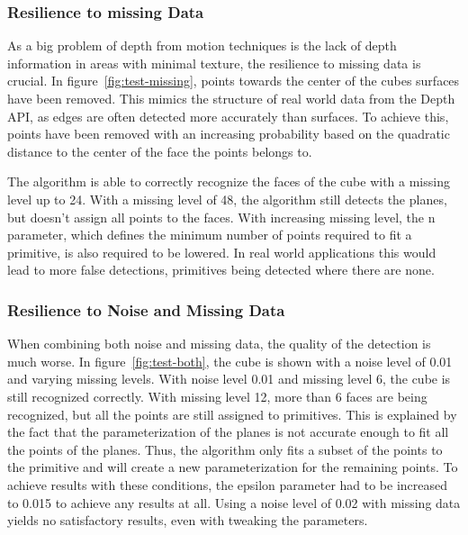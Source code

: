 \subsubsection{Resilience to missing Data}

As a big problem of depth from motion techniques is the lack of depth information in areas with minimal texture,
the resilience to missing data is crucial.
In figure~\ref{fig:test-missing}, points towards the center of the cubes surfaces have been removed.
This mimics the structure of real world data from the Depth API,
as edges are often detected more accurately than surfaces.
To achieve this, points have been removed with an increasing probability based on the
quadratic distance to the center of the face the points belongs to.

The algorithm is able to correctly recognize the faces of the cube with a missing level up to 24.
With a missing level of 48, the algorithm still detects the planes, but doesn't assign all points to the faces.
With increasing missing level, the n parameter, which defines the minimum number of points required to fit a primitive,
is also required to be lowered.
In real world applications this would lead to more false detections, primitives being detected where there are none.

%
%


\subsubsection{Resilience to Noise and Missing Data}

When combining both noise and missing data, the quality of the detection is much worse.
In figure~\ref{fig:test-both}, the cube is shown with a noise level of 0.01 and varying missing levels.
With noise level 0.01 and missing level 6, the cube is still recognized correctly.
With missing level 12, more than 6 faces are being recognized, but all the points are still assigned to primitives.
This is explained by the fact that the parameterization of the planes is not accurate enough to fit all the points of the planes.
Thus, the algorithm only fits a subset of the points to the primitive and will create a new parameterization
for the remaining points.
To achieve results with these conditions, the epsilon parameter had to be increased to 0.015 to achieve any results at all.
Using a noise level of 0.02 with missing data yields no satisfactory results, even with tweaking the parameters.

